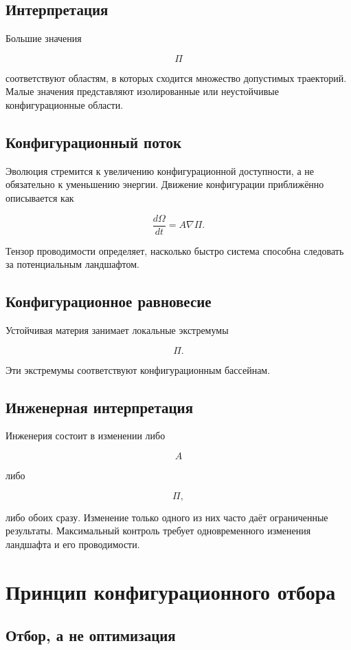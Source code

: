 \section{Интерпретация}

Большие значения

\[ \Pi \]

соответствуют областям, в которых сходится множество допустимых траекторий. Малые значения представляют изолированные или неустойчивые конфигурационные области.

\section{Конфигурационный поток}

Эволюция стремится к увеличению конфигурационной доступности, а не обязательно к уменьшению энергии. Движение конфигурации приближённо описывается как

\[ \boxed{ \frac{d\Omega}{dt} = A \nabla\Pi. } \]

Тензор проводимости определяет, насколько быстро система способна следовать за потенциальным ландшафтом.

\section{Конфигурационное равновесие}

Устойчивая материя занимает локальные экстремумы

\[ \Pi. \]

Эти экстремумы соответствуют конфигурационным бассейнам.

\section{Инженерная интерпретация}

Инженерия состоит в изменении либо

\[ A \]

либо

\[ \Pi, \]

либо обоих сразу. Изменение только одного из них часто даёт ограниченные результаты. Максимальный контроль требует одновременного изменения ландшафта и его проводимости.

\chapter{Принцип конфигурационного отбора}

\section{Отбор, а не оптимизация}


